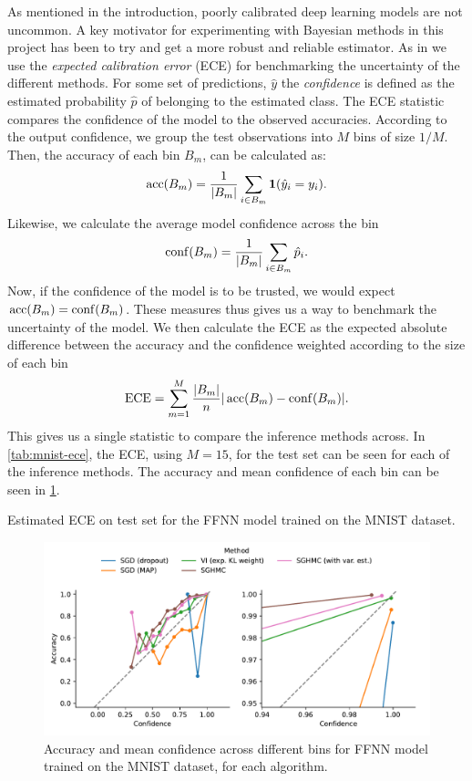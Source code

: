 As mentioned in the introduction, poorly calibrated deep learning models are not uncommon. 
A key motivator for experimenting with Bayesian methods in this project has been to try and get a more robust and reliable estimator.
As in \autocite{guo_calibration_2017} we use the \emph{expected calibration error} (ECE) for benchmarking the uncertainty of the different methods.
For some set of predictions, $\hat{y}$ the \emph{confidence} is defined as the estimated probability $\hat{p}$ of belonging to the estimated class.
The ECE statistic compares the confidence of the model to the observed accuracies.
According to the output confidence, we group the test observations into $M$ bins of size $1/M$. 
Then, the accuracy of each bin $B_m$, can be calculated as:
\begin{align}
    \operatorname{acc}(B_m) = \frac{1}{|B_m|}\sum_{i\in B_m}\bm{1}(\hat{y}_i = y_i).
\end{align}
Likewise, we calculate the average model confidence across the bin
\begin{align}
    \operatorname{conf}(B_m) = \frac{1}{|B_m|}\sum_{i\in B_m} \hat{p}_i.
\end{align}
Now, if the confidence of the model is to be trusted, we would expect $\operatorname{acc}(B_m) = \operatorname{conf}(B_m)$.
These measures thus gives us a way to benchmark the uncertainty of the model.
We then calculate the ECE as the expected absolute difference between the accuracy and the confidence weighted according to the size of each bin
\begin{align}
    \text{ECE} = \sum_{m=1}^{M} \frac{|B_m|}{n}|\operatorname{acc}(B_m)-\operatorname{conf}(B_m)|.
\end{align}
This gives us a single statistic to compare the inference methods across.
In \cref{tab:mnist-ece}, the ECE, using $M=15$, for the test set can be seen for each of the inference methods.
The accuracy and mean confidence of each bin can be seen in \cref{fig:mnist-calibration}. 
\begin{table}[htbp]
    \centering
    
    \caption{Estimated ECE on test set for the FFNN model trained on the MNIST dataset.}
    \label{tab:mnist-ece}
\end{table}
\begin{figure}[htbp]
    \centering
    \includegraphics[width=\linewidth]{Figures/mnist-calibration.pdf}
    \caption{Accuracy and mean confidence across different bins for FFNN model trained on the MNIST dataset, for each algorithm.}
    \label{fig:mnist-calibration}
\end{figure}
